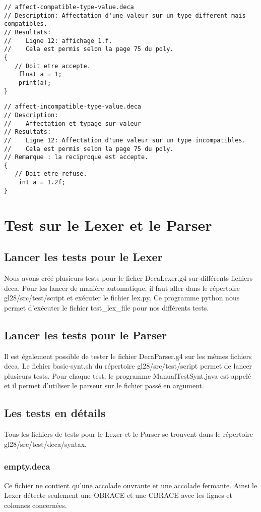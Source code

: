 \documentclass[12pt, a4paper, one side]{article}
\begin{document}
\begin{lstlisting}
// affect-compatible-type-value.deca
// Description: Affectation d'une valeur sur un type different mais compatibles.
// Resultats:
//    Ligne 12: affichage 1.f.
//    Cela est permis selon la page 75 du poly.
{
   // Doit etre accepte.
    float a = 1;
    print(a);
}
\end{lstlisting}

\begin{lstlisting}
// affect-incompatible-type-value.deca
// Description:
//    Affectation et typage sur valeur
// Resultats:
//    Ligne 12: Affectation d'une valeur sur un type incompatibles.
//    Cela est permis selon la page 75 du poly.
// Remarque : la reciproque est accepte.
{
   // Doit etre refuse.
    int a = 1.2f;
}
\end{lstlisting}

\section{Test sur le Lexer et le Parser}
\subsection{Lancer les tests pour le Lexer}
Nous avons créé plusieurs tests pour le ficher DecaLexer.g4 sur différents fichiers deca. Pour les lancer de manière automatique, il faut aller dans le répertoire gl28/src/test/script et exécuter le fichier lex.py. Ce programme python nous permet d'exécuter le fichier test\_lex\_file pour nos différents tests.

\subsection{Lancer les tests pour le Parser}
Il est également possible de tester le fichier DecaParser.g4 sur les mêmes fichiers deca. Le fichier basic-synt.sh du répertoire gl28/src/test/script permet de lancer plusieurs tests. Pour chaque test, le programme ManualTestSynt.java est appelé et il permet d'utiliser le parseur sur le fichier passé en argument.

\subsection{Les tests en détails}
Tous les fichiers de tests pour le Lexer et le Parser se trouvent dans le répertoire gl28/src/test/deca/syntax.

\subsubsection{empty.deca}
Ce fichier ne contient qu'une accolade ouvrante et une accolade fermante. Ainsi le Lexer détecte seulement une OBRACE et une CBRACE avec les lignes et colonnes concernées.
\end{document}
